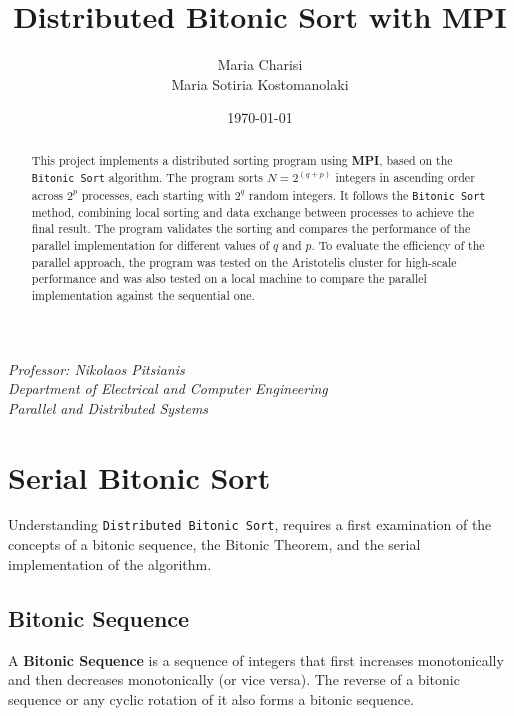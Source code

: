 \documentclass[12pt]{article}
\title{\textbf{Distributed Bitonic Sort with MPI}}
\author{Maria Charisi\\Maria Sotiria Kostomanolaki}
\date{\today}
\begin{document}
\maketitle

\begin{abstract}
This project implements a distributed sorting program using \textbf{MPI}, based on the \texttt{Bitonic Sort} algorithm. The program sorts \( N = 2^{(q + p)} \) integers in ascending order across \( 2^p \) processes, each starting with \( 2^q \) random integers. It follows the \texttt{Bitonic Sort} method, combining local sorting and data exchange between processes to achieve the final result. The program validates the sorting and compares the performance of the parallel implementation for different values of \( q \) and \( p \). To evaluate the efficiency of the parallel approach, the program was tested on the Aristotelis cluster for high-scale performance and was also tested on a local machine to compare the parallel implementation against the sequential one.
\end{abstract}

\tableofcontents

\vfill
\begin{center}
    \textit{Professor: Nikolaos Pitsianis\\
    Department of Electrical and Computer Engineering\\
    Parallel and Distributed Systems}
\end{center}
\newpage

\section{Serial Bitonic Sort}

Understanding \texttt{Distributed Bitonic Sort}, requires a first examination of the concepts of a bitonic sequence, the Bitonic Theorem, and the serial implementation of the algorithm.

\subsection{Bitonic Sequence}

\begin{definitionbox}
A \textbf{Bitonic Sequence} is a sequence of integers that first increases monotonically and then decreases monotonically (or vice versa). The reverse of a bitonic sequence or any cyclic rotation of it also forms a bitonic sequence.
\end{definitionbox}
\end{document}
